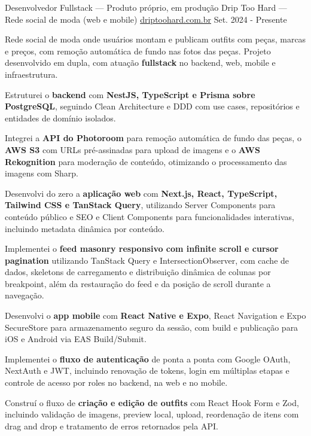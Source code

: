 \begin{cventries}
  \cventry
    {Desenvolvedor Fullstack --- Produto próprio, em produção} %
    {Drip Too Hard --- Rede social de moda (web e mobile)} %
    {\href{https://driptoohard.com.br}{driptoohard.com.br}} %
    {Set. 2024 - Presente} %
    {
      \begin{cvitems} %
        \item {Rede social de moda onde usuários montam e publicam outfits com peças, marcas e preços, com remoção automática de fundo nas fotos das peças. Projeto desenvolvido em dupla, com atuação \textbf{fullstack} no backend, web, mobile e infraestrutura.}
        \item {Estruturei o \textbf{backend} com \textbf{NestJS, TypeScript e Prisma sobre PostgreSQL}, seguindo Clean Architecture e DDD com use cases, repositórios e entidades de domínio isolados.}
        \item {Integrei a \textbf{API do Photoroom} para remoção automática de fundo das peças, o \textbf{AWS S3} com URLs pré-assinadas para upload de imagens e o \textbf{AWS Rekognition} para moderação de conteúdo, otimizando o processamento das imagens com Sharp.}
        \item {Desenvolvi do zero a \textbf{aplicação web} com \textbf{Next.js, React, TypeScript, Tailwind CSS e TanStack Query}, utilizando Server Components para conteúdo público e SEO e Client Components para funcionalidades interativas, incluindo metadata dinâmica por conteúdo.}
        \item {Implementei o \textbf{feed masonry responsivo com infinite scroll e cursor pagination} utilizando TanStack Query e IntersectionObserver, com cache de dados, skeletons de carregamento e distribuição dinâmica de colunas por breakpoint, além da restauração do feed e da posição de scroll durante a navegação.}
        \item {Desenvolvi o \textbf{app mobile} com \textbf{React Native e Expo}, React Navigation e Expo SecureStore para armazenamento seguro da sessão, com build e publicação para iOS e Android via EAS Build/Submit.}
        \item {Implementei o \textbf{fluxo de autenticação} de ponta a ponta com Google OAuth, NextAuth e JWT, incluindo renovação de tokens, login em múltiplas etapas e controle de acesso por roles no backend, na web e no mobile.}
        \item {Construí o fluxo de \textbf{criação e edição de outfits} com React Hook Form e Zod, incluindo validação de imagens, preview local, upload, reordenação de itens com drag and drop e tratamento de erros retornados pela API.}

\end{cvitems}}
\end{cventries}
